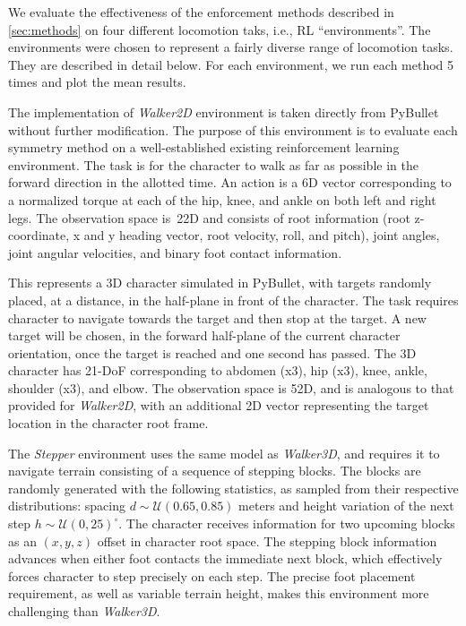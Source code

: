 We evaluate the effectiveness of the enforcement methods described in \autoref{sec:methods} 
on four different locomotion taks, i.e., RL ``environments''.  
The environments were chosen to represent a fairly diverse range of locomotion tasks.  
They are described in detail below.  
For each environment, we run each method 5 times and plot the mean results.

  The implementation of {\it Walker2D} environment is taken directly from PyBullet \citep{ref:Pybullet} 
without further modification.  The purpose of this environment is to evaluate each symmetry method on 
a well-established existing reinforcement learning environment.  
The task is for the character to walk as far as possible in the forward direction in the allotted time.  
An action is a 6D vector corresponding to a normalized torque at each of the hip, knee, and ankle on both left and right legs.  
The observation space is~22D and consists of root information (root z-coordinate, x and y heading vector, root velocity, 
roll, and pitch), joint angles, joint angular velocities, and binary foot contact information.

  This represents a 3D character simulated in PyBullet, with targets randomly placed, at a distance,
in the half-plane in front of the character.  
The task requires character to navigate towards the target and then stop at the target.  
A new target will be chosen, in the forward half-plane of the current character orientation, 
once the target is reached and one second has passed.  
The 3D character has 21-DoF corresponding to abdomen (x3), hip (x3), knee, ankle, shoulder (x3), and elbow.  
The observation space is 52D, and is analogous to that provided for {\it Walker2D},
with an additional 2D vector representing the target location in the character root frame.

  The {\it Stepper} environment uses the same model as \textit{Walker3D}, and 
requires it to navigate terrain consisting of a sequence of stepping blocks.  
The blocks are randomly generated with the following statistics, as sampled from their respective distributions:
spacing $d \sim \mathcal{U}(0.65, 0.85)$ meters and height variation of the next step $h \sim \mathcal{U}(0, 25)^{\circ}$.  
The character receives information for two upcoming blocks as an $(x,y,z)$ offset in character root space.  
The stepping block information advances when either foot contacts the immediate next block, 
which effectively forces character to step precisely on each step.  
The precise foot placement requirement, as well as variable terrain height, makes this environment 
more challenging than \textit{Walker3D}.

